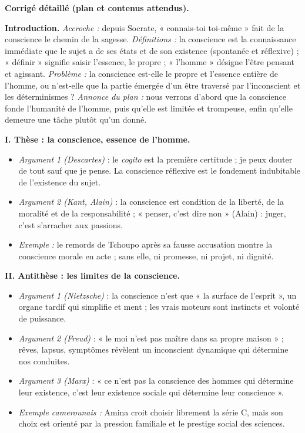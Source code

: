 \documentclass[11pt]{article}
\begin{document}
\begin{corrige}
\textbf{Corrigé détaillé (plan et contenus attendus).}

\textbf{Introduction.} \emph{Accroche :} depuis Socrate, « connais-toi toi-même » fait de la conscience le chemin de la sagesse. \emph{Définitions :} la conscience est la connaissance immédiate que le sujet a de ses états et de son existence (spontanée et réflexive) ; « définir » signifie saisir l'essence, le propre ; « l'homme » désigne l'être pensant et agissant. \emph{Problème :} la conscience est-elle le propre et l'essence entière de l'homme, ou n'est-elle que la partie émergée d'un être traversé par l'inconscient et les déterminismes ? \emph{Annonce du plan :} nous verrons d'abord que la conscience fonde l'humanité de l'homme, puis qu'elle est limitée et trompeuse, enfin qu'elle demeure une tâche plutôt qu'un donné.

\textbf{I. Thèse : la conscience, essence de l'homme.}
\begin{itemize}
\item \emph{Argument 1 (Descartes)} : le \emph{cogito} est la première certitude ; je peux douter de tout sauf que je pense. La conscience réflexive est le fondement indubitable de l'existence du sujet.
\item \emph{Argument 2 (Kant, Alain)} : la conscience est condition de la liberté, de la moralité et de la responsabilité ; « penser, c'est dire non » (Alain) : juger, c'est s'arracher aux passions.
\item \emph{Exemple :} le remords de Tchoupo après sa fausse accusation montre la conscience morale en acte ; sans elle, ni promesse, ni projet, ni dignité.
\end{itemize}

\textbf{II. Antithèse : les limites de la conscience.}
\begin{itemize}
\item \emph{Argument 1 (Nietzsche)} : la conscience n'est que « la surface de l'esprit », un organe tardif qui simplifie et ment ; les vrais moteurs sont instincts et volonté de puissance.
\item \emph{Argument 2 (Freud)} : « le moi n'est pas maître dans sa propre maison » ; rêves, lapsus, symptômes révèlent un inconscient dynamique qui détermine nos conduites.
\item \emph{Argument 3 (Marx)} : « ce n'est pas la conscience des hommes qui détermine leur existence, c'est leur existence sociale qui détermine leur conscience ».
\item \emph{Exemple camerounais :} Amina croit choisir librement la série C, mais son choix est orienté par la pression familiale et le prestige social des sciences.
\end{itemize}


\end{corrige}
\end{document}
